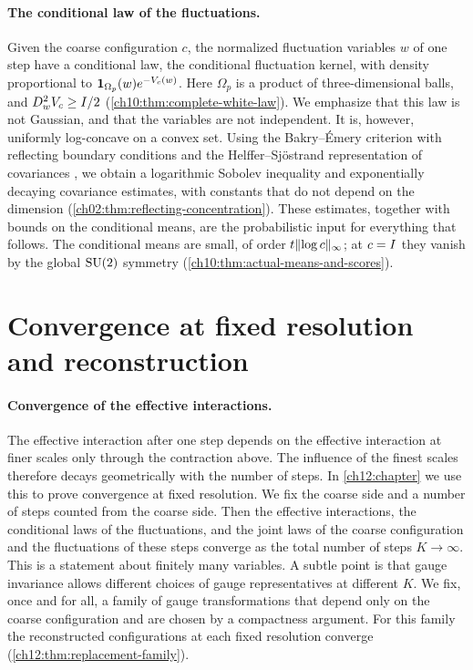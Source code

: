 \paragraph{The conditional law of the fluctuations.}
Given the coarse configuration $c$, the normalized fluctuation variables $w$ of one step have a conditional law, the conditional fluctuation kernel, with density proportional to $\mathbf 1_{\Omega_p}(w)e^{-V_c(w)}$. Here $\Omega_p$ is a product of three-dimensional balls, and $D_w^2V_c\ge I/2$ (\cref{ch10:thm:complete-white-law}). We emphasize that this law is not Gaussian, and that the variables are not independent. It is, however, uniformly log-concave on a convex set. Using the Bakry--\'Emery criterion \cite{BakryEmery1985} with reflecting boundary conditions and the Helffer--Sj\"ostrand representation of covariances \cite{HelfferSjostrand1994}, we obtain a logarithmic Sobolev inequality and exponentially decaying covariance estimates, with constants that do not depend on the dimension (\cref{ch02:thm:reflecting-concentration}). These estimates, together with bounds on the conditional means, are the probabilistic input for everything that follows. The conditional means are small, of order $t\lVert \log c\rVert_\infty$; at $c=I$ they vanish by the global $\mathrm{SU}(2)$ symmetry (\cref{ch10:thm:actual-means-and-scores}).

\section{Convergence at fixed resolution and reconstruction}\label{s3:fixed}

\paragraph{Convergence of the effective interactions.}
The effective interaction after one step depends on the effective interaction at finer scales only through the contraction above. The influence of the finest scales therefore decays geometrically with the number of steps. In \cref{ch12:chapter} we use this to prove convergence at fixed resolution. We fix the coarse side and a number of steps counted from the coarse side. Then the effective interactions, the conditional laws of the fluctuations, and the joint laws of the coarse configuration and the fluctuations of these steps converge as the total number of steps $K\to\infty$. This is a statement about finitely many variables. A subtle point is that gauge invariance allows different choices of gauge representatives at different $K$. We fix, once and for all, a family of gauge transformations that depend only on the coarse configuration and are chosen by a compactness argument. For this family the reconstructed configurations at each fixed resolution converge (\cref{ch12:thm:replacement-family}).

